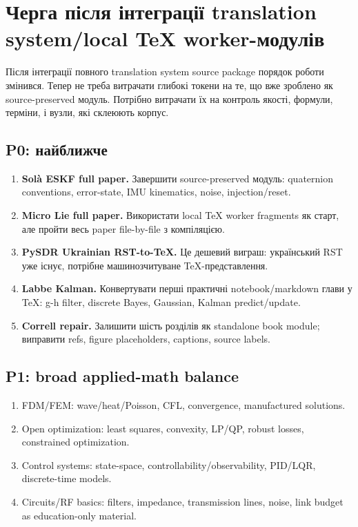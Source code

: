 \chapter{Черга після інтеграції translation system/local TeX worker-модулів}
\label{chap:session07-queue}

Після інтеграції повного translation system source package порядок роботи змінився. Тепер не треба витрачати глибокі токени на те, що вже зроблено як source-preserved модуль. Потрібно витрачати їх на контроль якості, формули, терміни, і вузли, які склеюють корпус.

\section{P0: найближче}

\begin{enumerate}[leftmargin=*]
\item \textbf{Solà ESKF full paper.} Завершити source-preserved модуль: quaternion conventions, error-state, IMU kinematics, noise, injection/reset.
\item \textbf{Micro Lie full paper.} Використати local TeX worker fragments як старт, але пройти весь paper file-by-file з компіляцією.
\item \textbf{PySDR Ukrainian RST-to-TeX.} Це дешевий виграш: український RST уже існує, потрібне машинозчитуване TeX-представлення.
\item \textbf{Labbe Kalman.} Конвертувати перші практичні notebook/markdown глави у TeX: g-h filter, discrete Bayes, Gaussian, Kalman predict/update.
\item \textbf{Correll repair.} Залишити шість розділів як standalone book module; виправити refs, figure placeholders, captions, source labels.
\end{enumerate}

\section{P1: broad applied-math balance}

\begin{enumerate}[leftmargin=*]
\item FDM/FEM: wave/heat/Poisson, CFL, convergence, manufactured solutions.
\item Open optimization: least squares, convexity, LP/QP, robust losses, constrained optimization.
\item Control systems: state-space, controllability/observability, PID/LQR, discrete-time models.
\item Circuits/RF basics: filters, impedance, transmission lines, noise, link budget as education-only material.
\end{enumerate}

